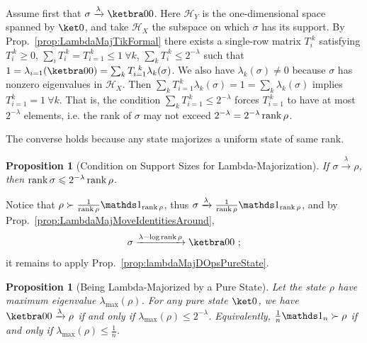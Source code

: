 \documentclass[11pt,a4paper]{article}
\theoremstyle{plain}
\newtheorem{prop}[thm]{Proposition}
\def\Hs{\mathscr{H}}%
\newenvironment{myproof}[1][\proofname]{%
  \color{prooftextcolor} \footnotesize \proof[\itshape #1]\hspace*{1.2mm}%
}{\endproof}
\newcommand{\lambdamaj}[1]{\xrightarrow{#1}}
\begin{document}
\begin{myproof}[Proof of Prop.~\ref{prop:lambdaMajDOpsPureState}]
  Assume first that  $\sigma\lambdamaj\lambda\ketbra00$. Here $\Hs_Y$ is the one-dimensional space
  spanned by $\ket0$, and take $\Hs_X$ the subspace on which $\sigma$ has its support. By
  Prop.~\ref{prop:LambdaMajTikFormal} there exists a single-row matrix
  $T_i^{~k}$ satisfying $T_i^{~k}\geqslant 0$, $\sum_i T_i^{~k} = T_{i=1}^{~k} \leqslant 1~\forall k$,
  $\sum_k T_i^{~k} \leqslant 2^{-\lambda}$ such that
  $1 = \lambda_{i=1}(\ketbra00) = \sum_k T_{i=1}^{~k} \lambda_k(\sigma)$. We also have $\lambda_k(\sigma)\neq 0$
  because $\sigma$ has nonzero eigenvalues in $\Hs_X$. Then
  $\sum_k T_{i=1}^{~k} \lambda_k(\sigma) = 1 = \sum_k\lambda_k(\sigma)$ implies $T_{i=1}^k = 1~\forall k$.
  That is, the condition $\sum_k T_{i=1}^{~k} \leqslant 2^{-\lambda}$ forces $T_{i=1}^{~k}$ to have at most
  $2^{-\lambda}$ elements, i.e. the rank of $\sigma$ may not exceed $2^{-\lambda}=2^{-\lambda} \operatorname{rank}\rho$.

  The converse holds because any state majorizes a uniform state of same rank.
\end{myproof}

\begin{prop}[Condition on Support Sizes for Lambda-Majorization]
  \label{prop:lambdaMajDOpsConditionRanks}
  If $\sigma\lambdamaj\lambda\rho$, then $\operatorname{rank}\sigma\leqslant 2^{-\lambda}\operatorname{rank}\rho$. 
\end{prop}

\begin{myproof}[Proof of Prop.~\ref{prop:lambdaMajDOpsConditionRanks}]
  Notice that $\rho\succ\frac1{\rank\rho}\Ident_{\rank\rho}$, thus
  $\sigma\lambdamaj\lambda\frac1{\rank\rho}\Ident_{\rank\rho}$, and by
  Prop.~\ref{prop:LambdaMajMoveIdentitiesAround},
  \begin{equation*}
    \sigma\lambdamaj{\lambda-\log\rank\rho} \ketbra00\ ;
  \end{equation*}
  it remains to apply Prop.~\ref{prop:lambdaMajDOpsPureState}.
\end{myproof}


\begin{prop}[Being Lambda-Majorized by a Pure State]
  \label{prop:LambdaMajorizedDOpsByPureState}
  Let the state $\rho$ have maximum eigenvalue $\lambda_\mathrm{max}(\rho)$.
  For any pure state $\ket0$, we have $\ketbra00 \lambdamaj\lambda \rho$ if and only if
  $\lambda_\mathrm{max}(\rho) \leqslant 2^{-\lambda}$. Equivalently, $\frac1n\Ident_n\succ\rho$ if and
  only if $\lambda_\mathrm{max}(\rho) \leqslant \frac1n$.
\end{prop}
\end{document}
